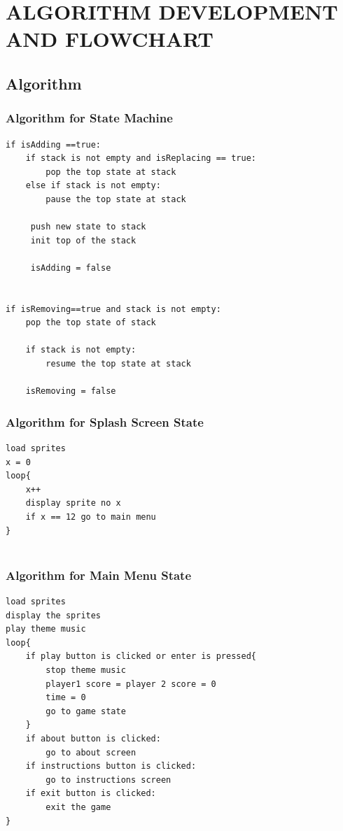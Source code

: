\documentclass[main]{subfiles}
\begin{document}
\chapter{ALGORITHM DEVELOPMENT AND FLOWCHART}

\section{Algorithm}
	\subsection{Algorithm for State Machine}
	
\begin{verbatim}
if isAdding ==true:
    if stack is not empty and isReplacing == true:
        pop the top state at stack
    else if stack is not empty:
        pause the top state at stack

     push new state to stack
     init top of the stack

     isAdding = false


if isRemoving==true and stack is not empty:
    pop the top state of stack
    
    if stack is not empty:
        resume the top state at stack

    isRemoving = false
\end{verbatim}


	\subsection{Algorithm for Splash Screen State}

\begin{verbatim}
load sprites
x = 0
loop{
    x++
    display sprite no x
    if x == 12 go to main menu
}


	\end{verbatim}
	
	\subsection{Algorithm for Main Menu State}
        \begin{verbatim}
load sprites
display the sprites
play theme music
loop{
    if play button is clicked or enter is pressed{
        stop theme music
        player1 score = player 2 score = 0
        time = 0 
        go to game state
    }
    if about button is clicked:
        go to about screen 
    if instructions button is clicked:
        go to instructions screen
    if exit button is clicked:
        exit the game
}

    \end{verbatim}	
\end{document}
